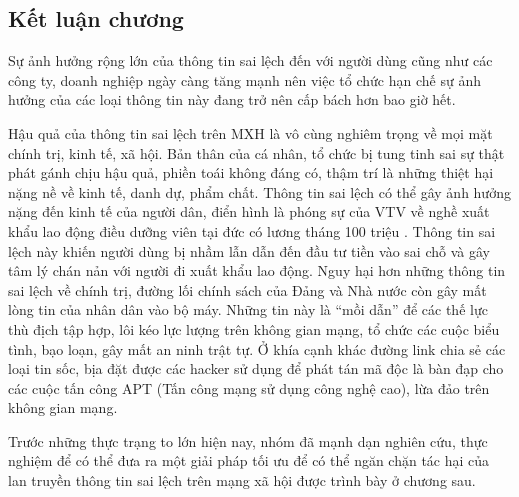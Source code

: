 	\subsection*{Kết luận chương}
	Sự ảnh hưởng rộng lớn của thông tin sai lệch đến với người dùng cũng như các công ty, doanh nghiệp ngày càng tăng mạnh nên việc tổ chức hạn chế sự ảnh hưởng của các loại thông tin này đang trở nên cấp bách hơn bao giờ hết. 
	
	Hậu quả của thông tin sai lệch trên MXH là vô cùng nghiêm trọng về mọi mặt chính trị, kinh tế, xã hội. Bản thân của cá nhân, tổ chức bị tung tinh sai sự thật phát gánh chịu hậu quả, phiền toái không đáng có, thậm trí là những thiệt hại nặng nề về kinh tế, danh dự, phẩm chất. Thông tin sai lệch có thể gây ảnh hưởng nặng đến kinh tế của người dân, điển hình là phóng sự của VTV về nghề xuất khẩu lao động điều dưỡng viên tại đức có lương tháng 100 triệu \cite{dieuduong}. Thông tin sai lệch này khiến người dùng bị nhầm lẫn dẫn đến đầu tư tiền vào sai chỗ và gây tâm lý chán nản với người đi xuất khẩu lao động. Nguy hại hơn những thông tin sai lệch về chính trị, đường lối chính sách của Đảng và Nhà nước còn gây mất lòng tin của nhân dân vào bộ máy. Những tin này là “mồi dẫn” để các thế lực thù địch tập hợp, lôi kéo lực lượng trên không gian mạng, tổ chức các cuộc biểu tình, bạo loạn, gây mất an ninh trật tự. Ở khía cạnh khác đường link chia sẻ các loại tin sốc, bịa đặt được các hacker sử dụng để phát tán mã độc là bàn đạp cho các cuộc tấn công APT (Tấn công mạng sử dụng công nghệ cao), lừa đảo trên không gian mạng.
	
	Trước những thực trạng to lớn hiện nay, nhóm đã mạnh dạn nghiên cứu, thực nghiệm để có thể đưa ra một giải pháp tối ưu để có thể ngăn chặn tác hại của lan truyền thông tin sai lệch trên mạng xã hội được trình bày ở chương sau.
			